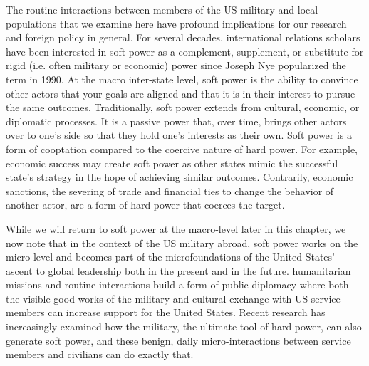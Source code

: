 The routine interactions between members of the US military and local populations that we examine here have profound implications for our research and foreign policy in general. For several decades, international relations scholars have been interested in soft power as a complement, supplement, or substitute for rigid (i.e. often military or economic) power since Joseph Nye popularized the term in 1990.\autocite{Nye1990} At the macro inter-state level, soft power is the ability to convince other actors that your goals are aligned and that it is in their interest to pursue the same outcomes. Traditionally, soft power extends from cultural, economic, or diplomatic processes. It is a passive power that, over time, brings other actors over to one's side so that they hold one's interests as their own. Soft power is a form of cooptation compared to the coercive nature of hard power.\autocite{Nye2004} For example, economic success may create soft power as other states mimic the successful state's strategy in the hope of achieving similar outcomes. Contrarily, economic sanctions, the severing of trade and financial ties to change the behavior of another actor, are a form of hard power that coerces the target. 

While we will return to soft power at the macro-level later in this chapter, we now note that in the context of the US military abroad, soft power works on the micro-level and becomes part of the microfoundations of the United States' ascent to global leadership both in the present and in the future. humanitarian missions and routine interactions build a form of public diplomacy where both the visible good works of the military and cultural exchange with US service members can increase support for the United States.\autocite{cull2008cold} Recent research has increasingly examined how the military, the ultimate tool of hard power, can also generate soft power, and these benign, daily micro-interactions between service members and civilians can do exactly that.\autocite{atkinson2014military,Martinez2021}

